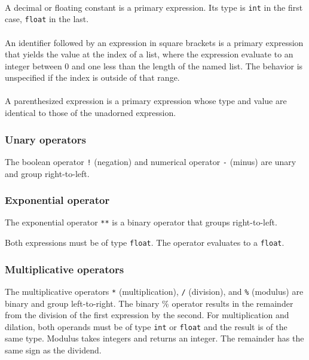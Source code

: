 \paragraph{}
A decimal or floating constant is a primary expression. Its type is \texttt{int} in the first case, \texttt{float} in the last. 

\paragraph{ \term{[}  \term{]} }
An identifier followed by an expression in square brackets is a primary expression that yields the value at the  index of a list, where the expression evaluate to an integer between 0 and one less than the length of the named list. The behavior is unspecified if the index is outside of that range. 

\paragraph{\term{(}  \term{)}}
A parenthesized expression is a primary expression whose type and value are identical to those of the unadorned expression. 

\subsubsection{Unary operators}

The boolean operator \texttt{!} (negation) and numerical operator \texttt{-} (minus) are unary and group right-to-left.

\begin{alltt}
\quad \term{-} 
\quad \term{!} 
\end{alltt}

\subsubsection{Exponential operator}

The exponential operator \texttt{**} is a binary operator that groups right-to-left.
\begin{alltt}
\quad {} \term{**} 
\end{alltt}
Both expressions must be of type \texttt{float}. The operator evaluates to a \texttt{float}. 

\subsubsection{Multiplicative operators}
The multiplicative operators \texttt{*} (multiplication), \texttt{/} (division), and \texttt{\%} (modulus) are binary and group left-to-right. The  binary \% operator results in the remainder from the division of the first expression by the second. For multiplication and dilation, both operands must be of type \texttt{int} or \texttt{float} and the result is of the same type. Modulus takes integers and returns an integer. The remainder has the same sign as the dividend.

